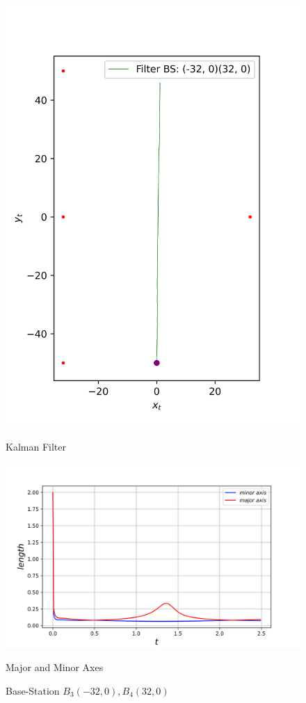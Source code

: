 \begin{figure}[H]
\begin{minipage}{0.49\linewidth}
        \includegraphics[width=\linewidth]{plots/part2-f-3-filter.png}
        \caption*{Kalman Filter}
    \end{minipage}
    \vspace{-0.1cm}
    \begin{minipage}{\linewidth}
        \centering
        \includegraphics[width=\linewidth]{plots/part2-f-3-axes.png}
        \caption*{Major and Minor Axes}
    \end{minipage}

    \caption{Base-Station $B_3(-32, 0), B_4 (32, 0)$}
\end{figure}

